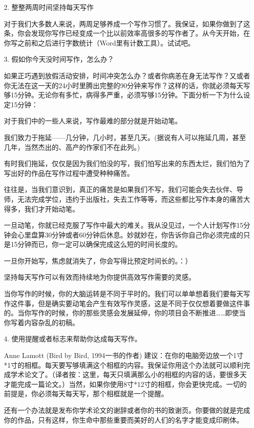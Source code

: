 \documentclass{ctexart}
\begin{document}
2. 整整两周时间坚持每天写作

对于我们大多数人来说，两周足够养成一个写作习惯了。我保证，如果你做到了这条，你会发现你写作已经变成一个比以前效率高很多的写作者了。从今天开始，在你写之前和之后进行字数统计（Word里有计数工具）。试试吧。

3. 假如你今天没时间写作，怎么办？

如果正巧遇到放假活动安排，时间冲突怎么办？或者你病恙在身无法写作？又或者你无法在这一天的24小时里腾出完整的90分钟来写作？这样的话，你就必须每天写够15分钟。无论你有多忙，病得多严重，必须写够15分钟。下面分析一下为什么设定15分钟：

{\heiti 对于我们中的一些人来说，写作最难的部分就是开始动笔。}

我们致力于拖延——几分钟，几小时，甚至几天。(据说有人可以拖延几周，甚至几年，当然杰出的、高产的作家们不在此列。)

有时我们拖延，仅仅是因为我们怕没的写，我们怕写出来的东西太烂，我们怕为了写出好的作品在写作过程中遭受种种痛苦。

往往是，当我们意识到，真正的痛苦是如果我们不写，我们可能会失去伙伴、导师，无法完成学位，违约于出版社，失去工作等等，而这些都比写作本身的痛苦大得多，我们才开始动笔。

一旦动笔，你就已经克服了写作中最大的难关。我从没见过，一个人计划写作15分钟会心里盘算30分钟或者60分钟后休息。妙就妙在，你告诉你自己你必须完成的只是15分钟而已，你一定可以确保完成这么短的时间长度的。

一旦你开始写，焦虑就消失了，你会写得比预定时间长的。：）

{\heiti 坚持每天写作可以有效而持续地为你提供高效写作需要的灵感。}

当你写作的时候，你的大脑运转是不同于平时的。我们可以单单想着我们要每天写作这件事，但是确实要动笔会产生有效写作灵感，这是不同于仅仅想着要做这件事的。当你写作的时候，你的那些灵感会发展延伸，你的项目会不断推进……即使当你写着内容杂乱的初稿。

4. 使用提醒或者标志来帮助你达成每天写作。

Anne Lamott (Bird by Bird, 1994一书的作者) 建议：在你的电脑旁边放一个1寸*1寸的相框。每天要写够填满这个相框的内容。我保证你用这个办法就可以顺利完成学术论文了。（译者按：这里，每天只填满那么小的相框的内容的话，要很多天才能完成一篇论文。）当然，如果你使用8寸*12寸的相框，你会更快完成。一切的前提是，你必须每天每天写，那个相框就是一个提醒。

还有一个办法就是发布你学术论文的谢辞或者你的书的致谢页。你要做的就是完成你的作品，只有这样，你生命中那些重要而美好的人们的名字才能变成印刷体。
\end{document}
